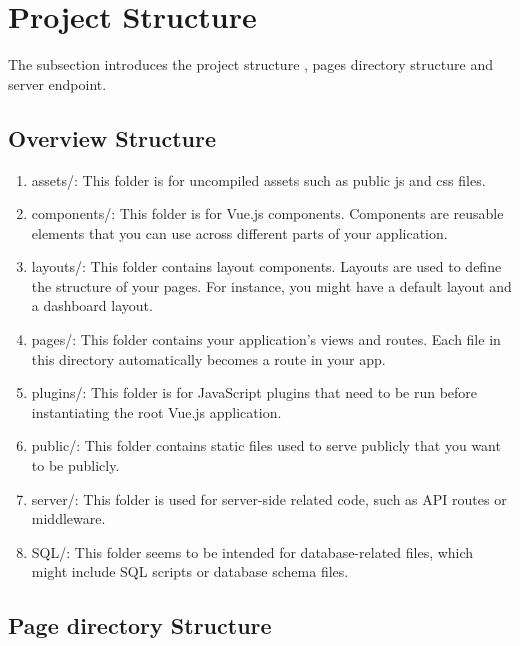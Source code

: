 
\section{Project Structure}
The subsection introduces the project structure , pages directory structure and server endpoint.
\subsection{Overview Structure}
\begin{enumerate}
	\item assets/: This folder is for uncompiled assets such as public js and css files.
	
	\item components/: This folder is for Vue.js components. Components are reusable elements that you can use across different parts of your application.
	
	\item layouts/: This folder contains layout components. Layouts are used to define the structure of your pages. For instance, you might have a default layout and a dashboard layout.
	
	\item pages/: This folder contains your application's views and routes. Each file in this directory automatically becomes a route in your app.
	
	\item plugins/: This folder is for JavaScript plugins that need to be run before instantiating the root Vue.js application.
	
	\item public/: This folder contains static files used to serve publicly that you want to be publicly.
	
	\item server/: This folder is used for server-side related code, such as API routes or middleware.
	
	\item SQL/: This folder seems to be intended for database-related files, which might include SQL scripts or database schema files.
\end{enumerate}
\subsection{Page directory Structure}

